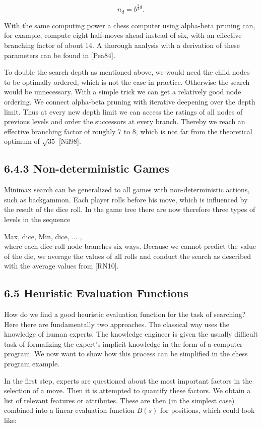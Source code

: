 \documentclass[10pt]{book}
\begin{document}
\begin{center}
\begin{enumerate}
$$
n_{d}=b^{\frac{3}{4} d} .
$$

With the same computing power a chess computer using alpha-beta pruning can, for example, compute eight half-moves ahead instead of six, with an effective branching factor of about 14. A thorough analysis with a derivation of these parameters can be found in [Pea84].

To double the search depth as mentioned above, we would need the child nodes to be optimally ordered, which is not the case in practice. Otherwise the search would be unnecessary. With a simple trick we can get a relatively good node ordering. We connect alpha-beta pruning with iterative deepening over the depth limit. Thus at every new depth limit we can access the ratings of all nodes of previous levels and order the successors at every branch. Thereby we reach an effective branching factor of roughly 7 to 8, which is not far from the theoretical optimum of $\sqrt{35}$ [Nil98].

\subsection*{6.4.3 Non-deterministic Games}
Minimax search can be generalized to all games with non-deterministic actions, such as backgammon. Each player rolls before his move, which is influenced by the result of the dice roll. In the game tree there are now therefore three types of levels in the sequence

Max, dice, Min, dice, ... ,\\[0pt]
where each dice roll node branches six ways. Because we cannot predict the value of the die, we average the values of all rolls and conduct the search as described with the average values from [RN10].

\subsection*{6.5 Heuristic Evaluation Functions}
How do we find a good heuristic evaluation function for the task of searching? Here there are fundamentally two approaches. The classical way uses the knowledge of human experts. The knowledge engineer is given the usually difficult task of formalizing the expert's implicit knowledge in the form of a computer program. We now want to show how this process can be simplified in the chess program example.


In the first step, experts are questioned about the most important factors in the selection of a move. Then it is attempted to quantify these factors. We obtain a list of relevant features or attributes. These are then (in the simplest case) combined into a linear evaluation function $B(s)$ for positions, which could look like:



\end{enumerate}
\end{center}
\end{document}
